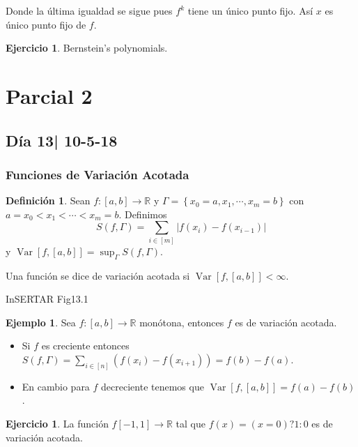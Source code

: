 \documentclass[12pt]{article}
\theoremstyle{plain}
\theoremstyle{definition}
\newtheorem{Def}[Th]{Definición}       %
\newtheorem{Ex}[Th]{Ejemplo}               %
\newtheorem{Ej}[Th]{Ejercicio}
\theoremstyle{remark}
\numberwithin{equation}{section}
\newcommand{\bR}{\mathbb{R}}        %
\renewcommand{\:}{\colon}           %
\newcommand{\conj}[1]{\left\lbrace#1\right\rbrace}
\newcommand{\bonj}[1]{\left\lbrack#1\right\rbrack}
\begin{document}
\begin{multicols}{2}
\begin{ptcb}
Donde la última igualdad se sigue pues $f^k$ tiene un único punto fijo. Así $x$ es único punto fijo de $f$.
 \end{ptcb}

\begin{Ej}
  Bernstein's polynomials.
\end{Ej}

\section{Parcial 2}

\subsection{Día 13| 10-5-18}

\subsubsection*{Funciones de Variación Acotada}

\begin{Def}
  Sean $f\colon\bonj{a,b}\to\bR$ y $\Gamma=\conj{x_0=a,x_1,\cdots,x_m=b}$ con $a=x_0<x_1<\cdots<x_m=b$. Definimos
  $$S(f,\Gamma)=\sum_{i\in\bonj{m}}|f(x_i)-f(x_{i-1})|$$
  y $\operatorname{Var}\bonj{f,\bonj{a,b}}=\sup_\Gamma S(f,\Gamma)$.\par
  Una función se dice de variación acotada si $\operatorname{Var}\bonj{f,\bonj{a,b}}<\infty$.
\end{Def}

InSERTAR Fig13.1

\begin{Ex}\label{ex:monotImpliesBndVar}
Sea $f\colon\bonj{a,b}\to\bR$ monótona, entonces $f$ es de variación acotada.
\end{Ex}

\begin{ptcb}
\begin{itemize}
  \item Si $f$ es creciente entonces $S(f,\Gamma)=\sum_{i\in\bonj{n}}(f(x_i)-f(x_{i+1}))=f(b)-f(a)$.
  \item En cambio para $f$ decreciente tenemos que $\operatorname{Var}\bonj{f,\bonj{a,b}}=f(a)-f(b)$.
\end{itemize}
\end{ptcb}

\begin{Ej}
  La función $f\bonj{-1,1}\to\bR$
tal que $f(x)=(x=0)?1\colon 0$ es de variación acotada.


\end{Ej}
\end{multicols}
\end{document}
